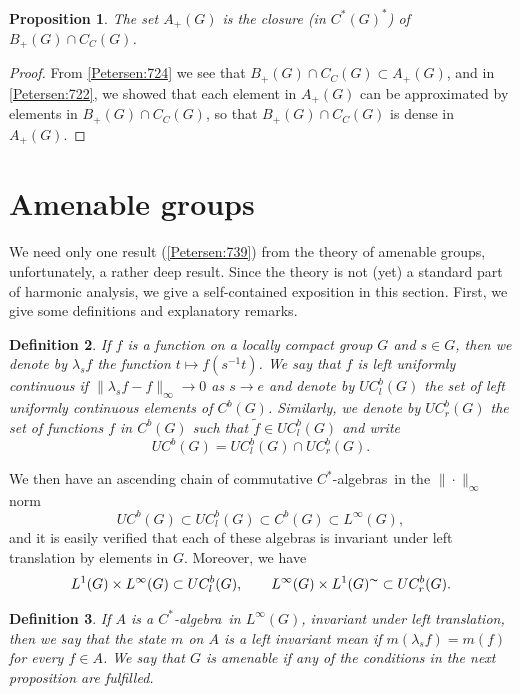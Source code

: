\documentclass{book}
\newtheorem{definition}{Definition}[section]
\newtheorem{proposition}[definition]{Proposition}
\def\cstar{\(C^*\)-algebra}
\def\cstars{\(C^*\)-algebras}
\begin{document}
\begin{proposition}\label{Petersen:725}
  The set \(A_+(G)\) is the closure (in \(C^*(G)^*\)) of \(B_+(G)\cap C_C(G)\).
\end{proposition}
\begin{proof}
  From \ref{Petersen:724} we see that \(B_+(G)\cap C_C(G)\subset A_+(G)\),
  and in \ref{Petersen:722}, we showed that each element in \(A_+(G)\) can be approximated by elements
  in \(B_+(G)\cap C_C(G)\), so that \(B_+(G)\cap C_C(G)\) is dense in \(A_+(G)\).
\end{proof}

\section{Amenable groups}
We need only one result (\ref{Petersen:739}) from the theory of amenable groups, 
unfortunately, a rather deep result. Since the theory is not (yet) a standard part of
harmonic analysis, we give a self-contained exposition in this section. First, we
give some definitions and explanatory remarks.
\begin{definition}
  If \(f\) is a function on a locally compact group \(G\) and \(s\in G\), then we denote by \(\lambda_s f\)
  the function \(t\mapsto f(s^{-1}t)\). We say that \(f\) is \textit{left uniformly continuous}
  if \(\|\lambda_s f-f\|_\infty\rightarrow 0\) as \(s\rightarrow e\) and denote by \(UC_l^b(G)\) the set of left uniformly 
  continuous elements of \(C^b(G)\). Similarly, we denote by \(UC_r^b(G)\) the set of 
  functions \(f\) in \(C^b(G)\) such that \(\tilde{f}\in UC_l^b(G)\) and write
  \[
    UC^b(G)=UC_l^b(G)\cap UC_r^b(G).
  \]
\end{definition}
We then have an ascending chain of commutative \cstars\ in the \(\|\cdot\|_\infty\) norm
\[
  UC^b(G)\subset UC_l^b(G)\subset C^b(G)\subset L^\infty(G),
\]
and it is easily verified that each of these algebras is invariant under left translation by elements in \(G\). Moreover, we have
\[
  L^1(G)\times L^\infty(G)\subset UC^b_l(G),\qquad L^\infty(G)\times L^1(G)^\thicksim \subset UC^b_r(G).
\]
\begin{definition}
  If \(A\) is a \cstar\ in \(L^\infty(G)\), invariant under left translation, then we say that the 
  state \(m\) on \(A\) is a \textnormal{left invariant mean} if \(m(\lambda_s f)=m(f)\) for every \(f\in A\).
  We say that \(G\) is \textnormal{amenable} if any of the conditions in the next proposition are fulfilled.
\end{definition}
\end{document}
